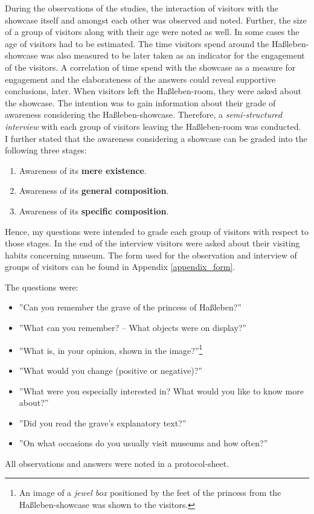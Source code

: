 During the observations of the studies, the interaction of visitors with the showcase itself and amongst each other was observed and noted. Further, the size of a group of visitors along with their age were noted as well. In some cases the age of visitors had to be estimated. The time visitors spend around the Haßleben-showcase was also measured to be later taken as an indicator for the engagement of the visitors. A correlation of time spend with the showcase as a measure for engagement and the elaborateness of the answers could reveal supportive conclusions, later. When visitors left the Haßleben-room, they were asked about the showcase. The intention was to gain information about their grade of awareness considering the Haßleben-showcase. Therefore, a \textit{semi-structured interview} with each group of visitors leaving the Haßleben-room was conducted.
\\
I further stated that the awareness considering a showcase can be graded into the following three stages:
\begin{enumerate}
	\item Awareness of its \textbf{mere existence}.
	\item Awareness of its \textbf{general composition}.
	\item Awareness of its \textbf{specific composition}.
\end{enumerate}  

Hence, my questions were intended to grade each group of visitors with respect to those stages. In the end of the interview visitors were asked about their visiting habits concerning museum. The form used for the observation and interview of groups of visitors can be found in Appendix \ref{appendix_form}. 

The questions were:
\begin{itemize}
	\item ''Can you remember the grave of the princess of Haßleben?''
	\item ''What can you remember? -- What objects were on display?''
	\item ''What is, in your opinion, shown in the image?''\footnote{An image of a \textit{jewel box} positioned by the feet of the princess from the Haßleben-showcase was shown to the visitors.}
	\item ''What would you change (positive or negative)?''
	\item ''What were you especially interested in? What would you like to know more about?''
	\item ''Did you read the grave's explanatory text?''
	\item ''On what occasions do you usually visit museums and how often?''
\end{itemize}
All observations and answers were noted in a protocol-sheet. 

